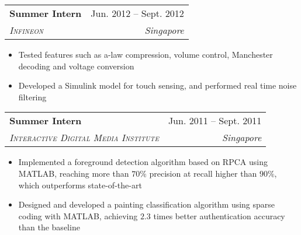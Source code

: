 \documentclass[letterpaper,11pt]{article}
\makeatletter
\newcommand{\resumeItem}[1]{
  \item\small{
    {#1 \vspace{-2pt}}
  }
}
\newcommand{\resumeSubheading}[4]{
  \vspace{-2pt}\item
    \begin{tabular*}{0.97\textwidth}[t]{l@{\extracolsep{\fill}}r}
      \textbf{#1} & #2 \\
      \textit{\small#3} & \textit{\small #4} \\
    \end{tabular*}\vspace{-7pt}
}
\newcommand{\resumeSubSubheading}[2]{
    \item
    \begin{tabular*}{0.97\textwidth}{l@{\extracolsep{\fill}}r}
      \textit{\small#1} & \textit{\small #2} \\
    \end{tabular*}\vspace{-7pt}
}
\newcommand{\resumeSubHeadingListEnd}{\end{itemize}}
\newcommand{\resumeItemListStart}{\begin{itemize}}
\newcommand{\resumeItemListEnd}{\end{itemize}\vspace{-5pt}}
\makeatother
\begin{document}
    \resumeSubheading
      {Summer Intern}{Jun. 2012 -- Sept. 2012}
      {\textsc{Infineon}}{Singapore}
      \resumeItemListStart
        \resumeItem{Tested features such as a-law compression, volume control, Manchester decoding and voltage conversion}
        \resumeItem{Developed a Simulink model for touch sensing, and performed real time noise filtering}
    \resumeItemListEnd

    \resumeSubheading
      {Summer Intern}{Jun. 2011 -- Sept. 2011}
      {\textsc{Interactive Digital Media Institute}}{Singapore}
      \resumeItemListStart
        \resumeItem{Implemented a foreground detection algorithm based on RPCA using MATLAB, reaching more than $70\%$ precision at recall higher than $90\%$, which outperforms state-of-the-art}
        \resumeItem{Designed and developed a painting classification algorithm using sparse coding with MATLAB, achieving $2.3$ times better authentication accuracy than the baseline}
    \resumeItemListEnd
      


\end{document}
